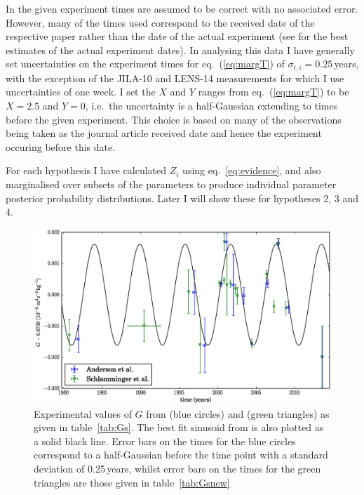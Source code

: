 \documentclass[page-classic]{epl2}
\begin{document}
In \cite{2015EL....11010002A} the given experiment times are assumed to be correct with no associated error.
However, many of the times used correspond to the received date of the respective paper rather than the
date of the actual experiment (see \cite{2015arXiv150501774S} for the best estimates of the actual experiment
dates). 
In analysing this data I have generally set uncertainties on the experiment times for eq.~(\ref{eq:margT}) of
$\sigma_{t,i} = 0.25$\,years, with the exception of the JILA-10 and LENS-14 measurements for which I use uncertainties
of one week. I set the $X$ and $Y$ ranges from eq.~(\ref{eq:margT}) to be $X=2.5$ and $Y=0$, i.e.\ the uncertainty
is a half-Gaussian extending to times before the given experiment. This choice is based on many of the observations
being taken as the journal article received date and hence the experiment occuring before this date.

For each hypothesis I have calculated $Z_i$ using eq.~\ref{eq:evidence}, and also marginalised over subsets of the 
parameters to produce individual parameter posterior probability distributions. Later I will show these for
hypotheses 2, 3 and 4.

\begin{figure}
 \centerline{\includegraphics[width=1.0\textwidth]{Gdata}}
 \caption{Experimental values of $G$ from \cite{2015EL....11010002A} (blue circles) and
 \cite{2015arXiv150501774S} (green triangles) as given in table~\ref{tab:Gs}.
 The best fit sinusoid from \cite{2015EL....11010002A} is also
 plotted as a solid black line. Error bars on the times for the blue circles correspond to a half-Gaussian
 before the time point with a standard deviation of 0.25\,years, whilst error bars on the times for the
 green triangles are those given in table~\ref{tab:Gsnew}}
 \label{fig:Gdata}
\end{figure}
\end{document}
